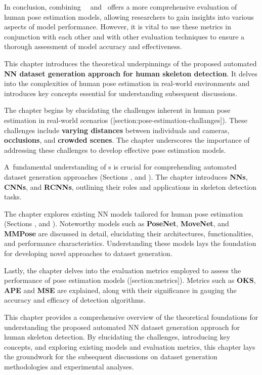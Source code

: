 In conclusion, combining \OKS\, \APE\ and \MSE\ offers a more comprehensive evaluation of human pose estimation models, allowing researchers to gain insights into various aspects of model performance. However, it is vital to use these metrics in conjunction with each other and with other evaluation techniques to ensure a thorough assessment of model accuracy and effectiveness.

This chapter introduces the theoretical underpinnings of the proposed automated {\bf NN dataset generation approach for human skeleton detection}. It delves into the complexities of human pose estimation in real-world environments and introduces key concepts essential for understanding subsequent discussions.


The chapter begins by elucidating the challenges inherent in human pose estimation in real-world scenarios ([section:pose-estimation-challanges]). These challenges include {\bf varying distances} between individuals and cameras, {\bf occlusions}, and {\bf crowded scenes}. The chapter underscores the importance of addressing these challenges to develop effective pose estimation models.


A~fundamental understanding of \NN\-s is crucial for comprehending automated dataset generation approaches (Sections \in[section:nn],  and ). The chapter introduces {\bf NNs}, {\bf CNNs}, and {\bf RCNNs}, outlining their roles and applications in skeleton detection tasks.


The chapter explores existing NN models tailored for human pose estimation (Sections ,  and ). Noteworthy models such as {\bf PoseNet}, {\bf MoveNet}, and {\bf MMPose} are discussed in detail, elucidating their architectures, functionalities, and performance characteristics. Understanding these models lays the foundation for developing novel approaches to dataset generation.


Lastly, the chapter delves into the evaluation metrics employed to assess the performance of pose estimation models ([section:metrics]). Metrics such as {\bf OKS}, {\bf APE} and {\bf MSE} are explained, along with their significance in gauging the accuracy and efficacy of detection algorithms.

This chapter provides a comprehensive overview of the theoretical foundations for understanding the proposed automated NN dataset generation approach for human skeleton detection. By elucidating the challenges, introducing key concepts, and exploring existing models and evaluation metrics, this chapter lays the groundwork for the subsequent discussions on dataset generation methodologies and experimental analyses.